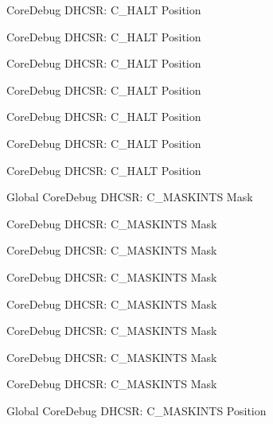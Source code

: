 \begin{DoxyRefList}
\label{deprecated__deprecated000488}%
%
Core\+Debug DHCSR\+: C\+\_\+\+HALT Position 

\label{deprecated__deprecated000125}%
%
Core\+Debug DHCSR\+: C\+\_\+\+HALT Position 

\label{deprecated__deprecated000264}%
%
Core\+Debug DHCSR\+: C\+\_\+\+HALT Position 

\label{deprecated__deprecated000590}%
%
Core\+Debug DHCSR\+: C\+\_\+\+HALT Position 

\label{deprecated__deprecated000323}%
%
Core\+Debug DHCSR\+: C\+\_\+\+HALT Position 

\label{deprecated__deprecated000037}%
%
Core\+Debug DHCSR\+: C\+\_\+\+HALT Position 

\label{deprecated__deprecated000399}%
%
Core\+Debug DHCSR\+: C\+\_\+\+HALT Position  
\item[Global \doxylink{group___c_m_s_i_s___core_debug_ga77fe1ef3c4a729c1c82fb62a94a51c31}{Core\+Debug\+\_\+\+DHCSR\+\_\+\+C\+\_\+\+MASKINTS\+\_\+\+Msk} ]\label{deprecated__deprecated000122}%
%
Core\+Debug DHCSR\+: C\+\_\+\+MASKINTS Mask 

\label{deprecated__deprecated000320}%
%
Core\+Debug DHCSR\+: C\+\_\+\+MASKINTS Mask 

\label{deprecated__deprecated000034}%
%
Core\+Debug DHCSR\+: C\+\_\+\+MASKINTS Mask 

\label{deprecated__deprecated000261}%
%
Core\+Debug DHCSR\+: C\+\_\+\+MASKINTS Mask 

\label{deprecated__deprecated000178}%
%
Core\+Debug DHCSR\+: C\+\_\+\+MASKINTS Mask 

\label{deprecated__deprecated000587}%
%
Core\+Debug DHCSR\+: C\+\_\+\+MASKINTS Mask 

\label{deprecated__deprecated000396}%
%
Core\+Debug DHCSR\+: C\+\_\+\+MASKINTS Mask 

\label{deprecated__deprecated000485}%
%
Core\+Debug DHCSR\+: C\+\_\+\+MASKINTS Mask  
\item[Global \doxylink{group___c_m_s_i_s___core_debug_ga0d2907400eb948a4ea3886ca083ec8e3}{Core\+Debug\+\_\+\+DHCSR\+\_\+\+C\+\_\+\+MASKINTS\+\_\+\+Pos} ]\label{deprecated__deprecated000319}%
%
Core\+Debug DHCSR\+: C\+\_\+\+MASKINTS Position 


\end{DoxyRefList}

